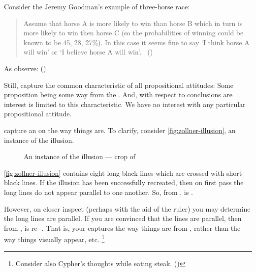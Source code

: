 \begin{note}
{    Consider the Jeremy Goodman's example of three-horse race:
    \begin{quote}
      Assume that horse A is more likely to win than horse B which in turn is more likely to win then horse C (so the probabilities of winning could be known to be 45, 28, 27\%).
      In this case it seems fine to say `I think horse A will win' or `I believe horse A will win'.%
      \mbox{ }\hfill\mbox{(\cite[1440]{Hawthorne:2016wv})}
    \end{quote}
    As \citeauthor{Hawthorne:2016wv} observe: 
    (\citeyear[1440, fn.17]{Hawthorne:2016wv})
  }

  Still,  capture the common characteristic of all propositional attitudes:
  Some proposition being some way from the \agpe{}.
  And, with respect to conclusions are interest is limited to this characteristic.
  We have no interest with any particular propositional attitude.
\end{note}

\begin{note}
  \nocite{Scriven:1962vq}
  \nocite{Woodward:2021ue}
  \nocite{Perry:1979vc}
  \nocite{Perry:1986aa}
  \nocite{Collins:1997wn}

   capture an \agpe{} on the way things are.
  To clarify, consider \autoref{fig:zollner-illusion}, an instance of the \citeauthor{Zollner:1860vx} illusion.

  \begin{figure}[!h]
    \centering
    \def\svgwidth{\columnwidth}
    
    \caption{An instance of the \citeauthor{Zollner:1860vx} illusion --- crop of ~\textcite{Fibonacci:2007vj}}
    \label{fig:zollner-illusion}
  \end{figure}

  \autoref{fig:zollner-illusion} contains eight long black lines which are crossed with short black lines.
  If the illusion has been successfully recreated, then on first pass the long lines do not appear parallel to one another.
  So, from ,  is \evaled{} .

  However, on closer inspect (perhaps with the aid of the ruler) you may determine the long lines are parallel.
  If you are convinced that the lines are parallel, then from ,  is re-\evaled{} .
  That is, your \evalN{} captures the way things are from , rather than the way things visually appear, etc.%
  \footnote{
    Consider also Cypher's thoughts while eating steak. (\cite[330--331]{Wachowski:2000uh})
  }
\end{note}


